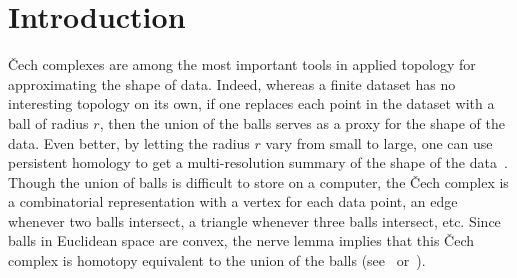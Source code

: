 \documentclass[11 pt,a4paper,twoside,reqno]{amsart}
\theoremstyle{definition}
\begin{document}



\section{Introduction}
\v{C}ech complexes are among the most important tools in applied topology for approximating the shape of data.
Indeed, whereas a finite dataset has no interesting topology on its own, if one replaces each point in the dataset with a ball of radius $r$, then the union of the balls serves as a proxy for the shape of the data.
Even better, by letting the radius $r$ vary from small to large, one can use persistent homology to get a multi-resolution summary of the shape of the data~\cite{Carlsson2009}.
Though the union of balls is difficult to store on a computer, the \v{C}ech complex is a combinatorial representation with a vertex for each data point, an edge whenever two balls intersect, a triangle whenever three balls intersect, etc.
Since balls in Euclidean space are convex, the nerve lemma implies that this \v{C}ech complex is homotopy equivalent to the union of the balls (see~\cite{Borsuk1948} or~\cite[Corollary~4G.3]{Hatcher}).
\end{document}
